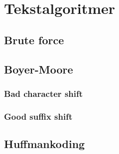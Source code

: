 \section{\color{red}Tekstalgoritmer}
\subsection{\color{red}Brute force}
\subsection{\color{red}Boyer-Moore}
\subsubsection{\color{red}Bad character shift}
\subsubsection{\color{red}Good suffix shift}
\subsection{\color{red}Huffmankoding}
\label{huffman}